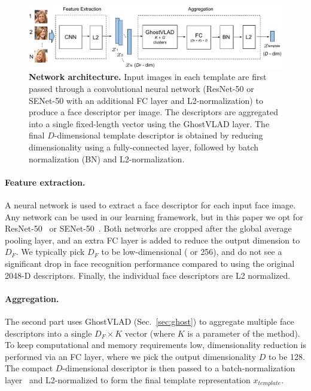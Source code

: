 \documentclass[runningheads]{llncs}
\begin{document}
\begin{figure}[t]
   \begin{center}
         \includegraphics[width=1\columnwidth]{images/cnn.pdf}
   \end{center}
   \caption{\textbf{Network architecture.}
Input images in each template are first 
passed through a convolutional 
neural network (\eg ResNet-50 or SENet-50 with an additional
FC layer and L2-normalization) to produce 
a face descriptor per image.
The descriptors are aggregated into a single fixed-length
vector using the GhostVLAD layer.
The final $D$-dimensional template descriptor
is obtained by reducing dimensionality using a fully-connected layer,
followed by batch normalization (BN) and
L2-normalization.
   }
    \label{fig:cnn}
%
\end{figure}



\paragraph{Feature extraction.}
A neural network is used to extract
a face descriptor for each input face image.
Any network can be used in our learning framework,
but in this paper we opt for
ResNet-50~\cite{He16} or SENet-50~\cite{Hu18}.
Both networks are cropped 
after the global average pooling layer,
and an extra FC layer is added to reduce the 
output dimension to $D_F$.
We typically pick $D_F$ to be low-dimensional ( or 256),
and do not see
a significant drop in face recognition performance
compared to using the original 2048-D descriptors.
Finally, the individual face descriptors are L2 normalized.


\paragraph{Aggregation.}
The second part uses GhostVLAD (Sec.~\ref{sec:ghost})
to aggregate multiple face descriptors into a single
$D_F \times K$ vector (where $K$ is a parameter of the method).
To keep computational and memory requirements low,
dimensionality reduction is performed via an FC layer,
%
where we pick the output dimensionality $D$ to be 128.
The compact $D$-dimensional
descriptor is then passed to a batch-normalization
layer~\cite{Ioffe15} and L2-normalized 
to form the final template 
representation $x_{template}$.
\end{document}

